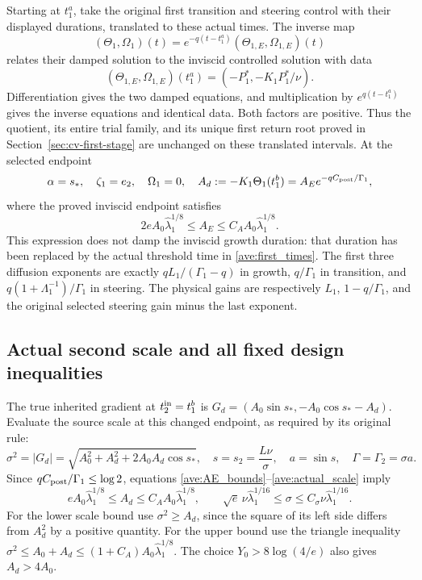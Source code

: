 Starting at $t_1^a$, take the original first transition and steering
control with their displayed durations, translated to these actual
times. The inverse map
\[
 (\Theta_1,\Omega_1)(t)
   =e^{-q(t-t_1^a)}(\Theta_{1,E},\Omega_{1,E})(t)
\]
relates their damped solution to the inviscid controlled solution
with data
\[
 (\Theta_{1,E},\Omega_{1,E})(t_1^a)
       =(-P_1^*,-K_1P_1^*/\nu).
\]
Differentiation gives the two damped equations, and multiplication
by $e^{q(t-t_1^a)}$ gives the inverse equations and identical data.
Both factors are positive. Thus the quotient, its entire trial
family, and its unique first return root proved in
Section~\ref{sec:cv-first-stage} are unchanged on these translated
intervals. At the selected endpoint
\begin{equation}\label{ave:first_endpoint}
 \alpha=s_*,\quad\zeta_1=e_2,\quad\Omega_1=0,\quad
 A_d:=-K_1\Theta_1(t_1^b)
       =A_Ee^{-qC_{\rm post}/\Gamma_1},
\end{equation}
where the proved inviscid endpoint satisfies
\begin{equation}\label{ave:AE_bounds}
 2eA_0\widehat\lambda_1^{1/8}\leq A_E
          \leq C_A A_0\widehat\lambda_1^{1/8}.
\end{equation}
This expression does not damp the inviscid growth duration: that
duration has been replaced by the actual threshold time in
\eqref{ave:first_times}. The first three diffusion exponents are
exactly $qL_1/(\Gamma_1-q)$ in growth, $q/\Gamma_1$ in transition,
and $q(1+\Lambda_1^{-1})/\Gamma_1$ in steering. The physical gains
are respectively $L_1$, $1-q/\Gamma_1$, and the original selected
steering gain minus the last exponent.

\subsection{Actual second scale and all fixed design inequalities}

The true inherited gradient at $t_2^{\rm in}=t_1^b$ is
$G_d=(A_0\sin s_*,-A_0\cos s_*-A_d)$. Evaluate the source scale
at this changed endpoint, as required by its original rule:
\begin{equation}\label{ave:actual_scale}
 \sigma^2=|G_d|
   =\sqrt{A_0^2+A_d^2+2A_0A_d\cos s_*},\quad
 s=s_2=\frac{L\nu}{\sigma},\quad a=\sin s,\quad
 \Gamma=\Gamma_2=\sigma a.
\end{equation}
Since $qC_{\rm post}/\Gamma_1\leq\log2$, equations
\eqref{ave:AE_bounds}--\eqref{ave:actual_scale} imply
\begin{equation}\label{ave:scale_bounds}
 eA_0\widehat\lambda_1^{1/8}\leq A_d\leq
 C_A A_0\widehat\lambda_1^{1/8},\qquad
 \sqrt e\,\nu\widehat\lambda_1^{1/16}\leq\sigma
       \leq C_\sigma\nu\widehat\lambda_1^{1/16}.
\end{equation}
For the lower scale bound use $\sigma^2\geq A_d$, since the square
of its left side differs from $A_d^2$ by a positive quantity.
For the upper bound use the triangle inequality
$\sigma^2\leq A_0+A_d\leq(1+C_A)A_0\widehat\lambda_1^{1/8}$.
The choice $Y_0>8\log(4/e)$ also gives $A_d>4A_0$.

